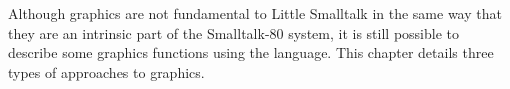 \secdown

Although graphics are not fundamental to Little Smalltalk in the same
way that they are an intrinsic part of the Smalltalk-80 system, it is still
possible to describe some graphics functions using the language. This
chapter details three types of approaches to graphics.


\secup
